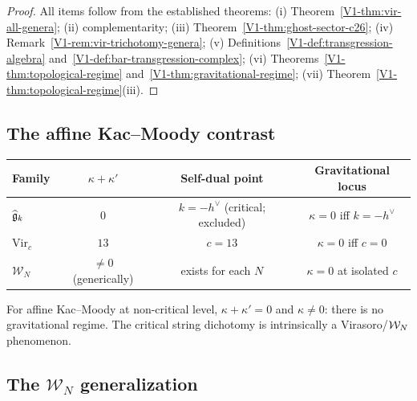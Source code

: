\begin{proof}
All items follow from the established theorems:
(i) Theorem~\ref{V1-thm:vir-all-genera};
(ii) complementarity;
(iii) Theorem~\ref{V1-thm:ghost-sector-c26};
(iv) Remark~\ref{V1-rem:vir-trichotomy-genera};
(v) Definitions~\ref{V1-def:transgression-algebra}
and~\ref{V1-def:bar-transgression-complex};
(vi) Theorems~\ref{V1-thm:topological-regime}
and~\ref{V1-thm:gravitational-regime};
(vii) Theorem~\ref{V1-thm:topological-regime}(iii).
\end{proof}

%
%

\subsection{The affine Kac--Moody contrast}

\begin{remark}
\begin{center}
\renewcommand{\arraystretch}{1.3}
\begin{tabular}{lccc}
\toprule
Family & $\kappa + \kappa'$ & Self-dual point &
Gravitational locus \\
\midrule
$\widehat{\mathfrak{g}}_k$ &
$0$ & $k = -h^\vee$ (critical; excluded) &
$\kappa = 0$ iff $k = -h^\vee$ \\
$\mathrm{Vir}_c$ &
$13$ & $c = 13$ &
$\kappa = 0$ iff $c = 0$ \\
$\mathcal{W}_N$ &
$\ne 0$ (generically) & exists for each $N$ &
$\kappa = 0$ at isolated $c$ \\
\bottomrule
\end{tabular}
\end{center}
For affine Kac--Moody at non-critical level, $\kappa + \kappa' = 0$
and $\kappa \neq 0$: there is no gravitational regime. The
critical string dichotomy is intrinsically a Virasoro/$\mathcal{W}_N$
phenomenon.
\end{remark}

\subsection{The $\mathcal{W}_N$ generalization}


